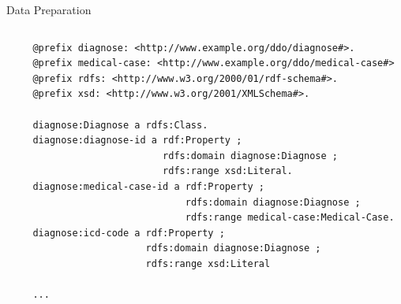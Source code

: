 \message{ !name(presentation.tex)}\documentclass{beamer}
\begin{document}
\begin{frame}[fragile]{Data Preparation}
\begin{columns}
\begin{column}{.3\textwidth}
\end{column}%
\hfill%
\begin{column}{.66\textwidth}
{\tiny
\begin{verbatim}
@prefix diagnose: <http://www.example.org/ddo/diagnose#>.
@prefix medical-case: <http://www.example.org/ddo/medical-case#>
@prefix rdfs: <http://www.w3.org/2000/01/rdf-schema#>.
@prefix xsd: <http://www.w3.org/2001/XMLSchema#>.

diagnose:Diagnose a rdfs:Class.
diagnose:diagnose-id a rdf:Property ;
                       rdfs:domain diagnose:Diagnose ;
                       rdfs:range xsd:Literal.
diagnose:medical-case-id a rdf:Property ;
                           rdfs:domain diagnose:Diagnose ;
                           rdfs:range medical-case:Medical-Case.
diagnose:icd-code a rdf:Property ;
                    rdfs:domain diagnose:Diagnose ;
                    rdfs:range xsd:Literal

...
\end{verbatim}
}
\end{column}%
\end{columns}
\end{frame}
\end{document}
